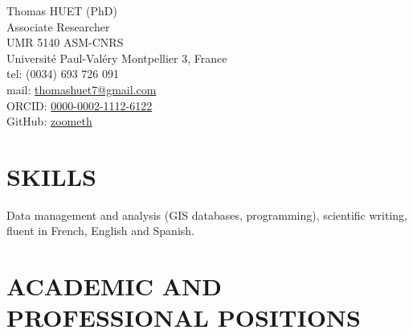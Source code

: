 \documentclass[11pt]{report} %
\begin{document}
Thomas HUET (PhD) \\
Associate Researcher \\
UMR 5140 ASM-CNRS\\
Universit\'{e} Paul-Val\'{e}ry Montpellier 3, France \\
tel: (0034) 693 726 091 \\
mail: \href{mailto:thomashuet7@gmail.com}{thomashuet7@gmail.com} \\
ORCID: \href{https://orcid.org/0000-0002-1112-6122}{0000-0002-1112-6122} \\
GitHub: \href{https://github.com/zoometh/thomashuet.github.io/blob/main/README.md}{zoometh} \\
 
\section*{SKILLS}

Data management and analysis (GIS databases, programming), scientific writing, fluent in French, English and Spanish. 

\section*{ACADEMIC AND PROFESSIONAL POSITIONS}
\end{document}
